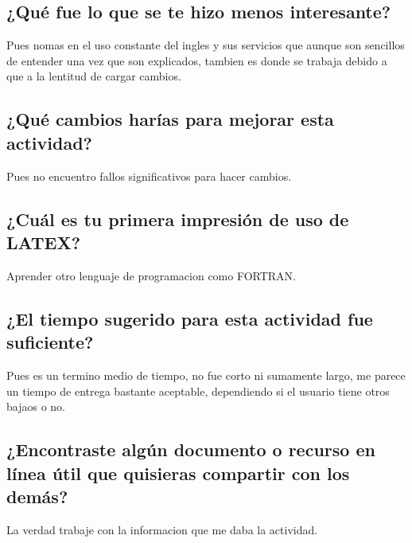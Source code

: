 \documentclass{article}
\begin{document}
\subsection{¿Qué fue lo que se te hizo menos interesante?}
Pues nomas en el uso constante del ingles y sus servicios que aunque son sencillos de entender una vez que son explicados, tambien es donde se trabaja debido a que a la lentitud de cargar cambios.
\subsection{¿Qué cambios harías para mejorar esta actividad?}
Pues no encuentro fallos significativos para hacer cambios.
\subsection{¿Cuál es tu primera impresión de uso de LATEX?}
Aprender otro lenguaje de programacion como FORTRAN.
\subsection{¿El tiempo sugerido para esta actividad fue suficiente?}
Pues es un termino medio de tiempo, no fue corto ni sumamente largo, me parece un tiempo de entrega bastante aceptable, dependiendo si el usuario tiene otros bajaos o no.
\subsection{¿Encontraste algún documento o recurso en línea útil que quisieras compartir con los demás?}
La verdad trabaje con la informacion que me daba la actividad.
\end{document}
